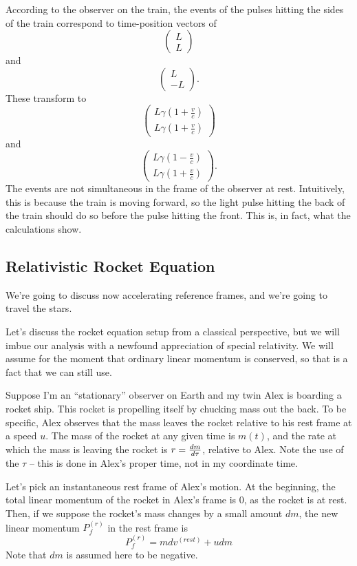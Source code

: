 According to the observer on the train, the events of the pulses hitting the sides of the train correspond to time-position vectors of 
\[\begin{pmatrix}
    L \\ L
\end{pmatrix} \] and \[\begin{pmatrix}
    L \\ -L
\end{pmatrix}. \] These transform to 
\[\begin{pmatrix}
    L\gamma\left(1+\frac{v}{c}\right) \\ L\gamma\left(1+\frac{v}{c}\right)
\end{pmatrix} \] and \[\begin{pmatrix}
    L\gamma\left(1-\frac{v}{c}\right) \\ L\gamma\left(1+\frac{v}{c}\right)
\end{pmatrix}. \] 
The events are not simultaneous in the frame of the observer at rest. Intuitively, this is because the train is moving forward, so the light pulse hitting the back of the train should do so before the pulse hitting the front. This is, in fact, what the calculations show.

\subsection{Relativistic Rocket Equation}
We're going to discuss now accelerating reference frames, and we're going to travel the stars. 

Let's discuss the rocket equation setup from a classical perspective, but we will imbue our analysis with a newfound appreciation of special relativity. We will assume for the moment that ordinary linear momentum is conserved, so that is a fact that we can still use. 

Suppose I'm an ``stationary'' observer on Earth and my twin Alex is boarding a rocket ship. This rocket is propelling itself by chucking mass out the back. To be specific, Alex observes that the mass leaves the rocket relative to his rest frame at a speed $u$. The mass of the rocket at any given time is $m(t)$, and the rate at which the mass is leaving the rocket is $r = \frac{d m}{d \tau}$, relative to Alex. Note the use of the $\tau$ -- this is done in Alex's proper time, not in my coordinate time. 

Let's pick an instantaneous rest frame of Alex's motion. At the beginning, the total linear momentum of the rocket in Alex's frame is $0$, as the rocket is at rest. Then, if we suppose the rocket's mass changes by a small amount $dm$, the new linear momentum $P_f^{(r)}$ in the rest frame is 
\[
    P_f^{(r)} = m dv^{(rest)} + u dm
\]
Note that $dm$ is assumed here to be negative. 

